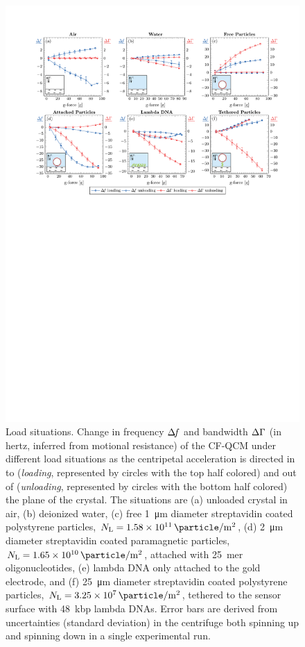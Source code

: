 \begin{figure}[ht]
\centering
\includegraphics{qcm/figures/figure2.pdf}
\caption{Load situations.
Change in frequency $\Delta\!f$ and bandwidth $\Delta\Gamma$
(in hertz, inferred from motional resistance) of
the CF-QCM under different load situations as the centripetal acceleration
is directed in to (\textit{loading}, represented by circles with the top half
colored) and out of (\textit{unloading}, represented by circles with the
bottom half colored) the plane of the crystal.
The situations are 
(a) unloaded crystal in air, 
(b) deionized water, 
(c) free \SI{1}{\micro\meter} diameter streptavidin coated polystyrene
particles, $N_\mathrm{L}=\SI{1.58e11}{\particle\per\meter\squared}$,
(d) \SI{2}{\micro\meter} diameter streptavidin coated paramagnetic
particles, $N_\mathrm{L}=\SI{1.65e10}{\particle\per\meter\squared}$,
attached with \SI{25}{mer} oligonucleotides, 
(e) lambda DNA only attached to the gold electrode, and
(f) \SI{25}{\micro\meter} diameter streptavidin
coated polystyrene particles,
$N_\mathrm{L}=\SI{3.25e7}{\particle\per\meter\squared}$, tethered to the sensor surface with
\SI{48}{kbp} lambda DNAs.  Error bars are derived from uncertainties
(standard deviation) in
the centrifuge both spinning up and spinning down in a single experimental
run.
} 
\label{fig:loadplot}
\end{figure}

